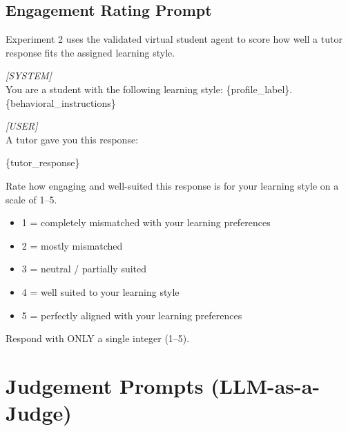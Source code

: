 \subsection{Engagement Rating Prompt}
Experiment 2 uses the validated virtual student agent to score how well a tutor response fits the assigned learning style.
\begin{shadedquotation}
    \textit{[SYSTEM]} \\
    You are a student with the following learning style: \{profile\_label\}. \{behavioral\_instructions\}

    \vspace{0.5em}
    \textit{[USER]} \\
    A tutor gave you this response:

    \{tutor\_response\}

    Rate how engaging and well-suited this response is for your learning style on a scale of 1--5.
    \begin{itemize}
        \item 1 = completely mismatched with your learning preferences
        \item 2 = mostly mismatched
        \item 3 = neutral / partially suited
        \item 4 = well suited to your learning style
        \item 5 = perfectly aligned with your learning preferences
    \end{itemize}
    Respond with ONLY a single integer (1--5).
\end{shadedquotation}

\section{Judgement Prompts (LLM-as-a-Judge)}

